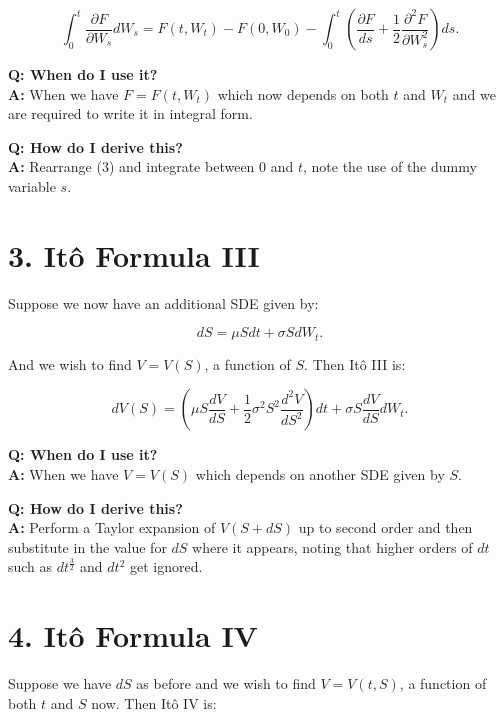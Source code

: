 \documentclass[11pt]{article}
\begin{document}
\begin{equation}
    \int_{0}^{t} \frac{\partial F}{\partial W_s} dW_s = F(t, W_t) - F(0, W_0) - \int_{0}^{t} \left(\frac{\partial F}{ds} + \frac{1}{2} \frac{\partial^{2} F}{\partial W_s^{2}}\right) ds.
\end{equation}

\textbf{Q: When do I use it?} \\
\textbf{A:} When we have $F = F(t, W_t)$ which now depends on both $t$ and $W_t$ and we are required to write it in integral form.

\textbf{Q: How do I derive this?} \\
\textbf{A:} Rearrange (3) and integrate between 0 and $t$, note the use of the dummy variable $s$.

\vspace{1cm}


\section*{3. Itô Formula III}
Suppose we now have an additional SDE given by:

\begin{equation*}
    dS = \mu S dt + \sigma S dW_t.
\end{equation*}

And we wish to find $V = V(S)$, a function of $S$. Then Itô III is:

\begin{equation}
    dV(S) = \left(\mu S \frac{dV}{dS} + \frac{1}{2} \sigma^2 S^2 \frac{d^{2} V}{d S^{2}}\right) dt + \sigma S \frac{dV}{dS} dW_t.    
\end{equation}

\textbf{Q: When do I use it?} \\
\textbf{A:} When we have $V = V(S)$ which depends on another SDE given by $S$.

\textbf{Q: How do I derive this?} \\
\textbf{A:} Perform a Taylor expansion of $V(S+dS)$ up to second order and then substitute in the value for $dS$ where it appears, noting that higher orders of $dt$ such as $dt^{\frac{3}{2}}$ and $dt^2$ get ignored.   

\newpage


\section*{4. Itô Formula IV}
Suppose we have $dS$ as before and we wish to find $V = V(t,S)$, a function of both $t$ and $S$ now. Then Itô IV is:
\end{document}
